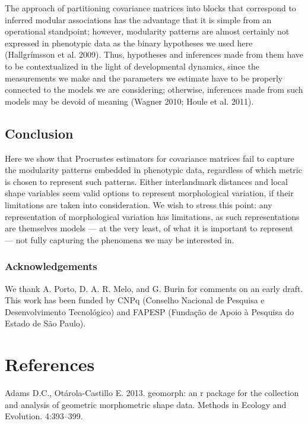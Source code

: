 \documentclass[12pt,]{article}
\begin{document}
The approach of partitioning covariance matrices into blocks that
correspond to inferred modular associations has the advantage that it is
simple from an operational standpoint; however, modularity patterns are
almost certainly not expressed in phenotypic data as the binary
hypotheses we used here (Hallgrímsson et al. 2009). Thus, hypotheses and
inferences made from them have to be contextualized in the light of
developmental dynamics, since the measurements we make and the
parameters we estimate have to be properly connected to the models we
are considering; otherwise, inferences made from such models may be
devoid of meaning (Wagner 2010; Houle et al. 2011).

\subsection{Conclusion}\label{conclusion}

Here we show that Procrustes estimators for covariance matrices fail to
capture the modularity patterns embedded in phenotypic data, regardless
of which metric is chosen to represent such patterns. Either
interlandmark distances and local shape variables seem valid options to
represent morphological variation, if their limitations are taken into
consideration. We wish to stress this point: any representation of
morphological variation has limitations, as such representations are
themselves models --- at the very least, of what it is important to
represent --- not fully capturing the phenomena we may be interested in.

\subsubsection{Acknowledgements}\label{acknowledgements}

We thank A. Porto, D. A. R. Melo, and G. Burin for comments on an early
draft. This work has been funded by CNPq (Conselho Nacional de Pesquisa
e Desenvolvimento Tecnológico) and FAPESP (Fundação de Apoio à Pesquisa
do Estado de São Paulo).

\section*{References}\label{references}

Adams D.C., Otárola-Castillo E. 2013. geomorph: an r package for the
collection and analysis of geometric morphometric shape data. Methods in
Ecology and Evolution. 4:393--399.
\end{document}
